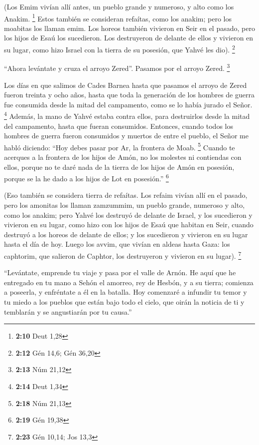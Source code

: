  (Los Emim vivían allí antes, un pueblo grande y
numeroso, y alto como los Anakim. \footnote{\textbf{2:10} Deut 1,28}
 Estos también se consideran refaítas, como los anakim;
pero los moabitas los llaman emim.  Los horeos también
vivieron en Seir en el pasado, pero los hijos de Esaú los sucedieron.
Los destruyeron de delante de ellos y vivieron en su lugar, como hizo
Israel con la tierra de su posesión, que Yahvé les dio). \footnote{\textbf{2:12}
  Gén 14,6; Gén 36,20}

 ``Ahora levántate y cruza el arroyo Zered''. Pasamos por
el arroyo Zered. \footnote{\textbf{2:13} Núm 21,12}

 Los días en que salimos de Cades Barnea hasta que
pasamos el arroyo de Zered fueron treinta y ocho años, hasta que toda la
generación de los hombres de guerra fue consumida desde la mitad del
campamento, como se lo había jurado el Señor. \footnote{\textbf{2:14}
  Deut 1,34}  Además, la mano de Yahvé estaba contra
ellos, para destruirlos desde la mitad del campamento, hasta que fueran
consumidos.  Entonces, cuando todos los hombres de guerra
fueron consumidos y muertos de entre el pueblo,  el Señor
me habló diciendo:  ``Hoy debes pasar por Ar, la frontera
de Moab. \footnote{\textbf{2:18} Núm 21,13}  Cuando te
acerques a la frontera de los hijos de Amón, no los molestes ni
contiendas con ellos, porque no te daré nada de la tierra de los hijos
de Amón en posesión, porque se la he dado a los hijos de Lot en
posesión.'' \footnote{\textbf{2:19} Gén 19,38}

 (Eso también se considera tierra de refaítas. Los refaim
vivían allí en el pasado, pero los amonitas los llaman zamzummim,
 un pueblo grande, numeroso y alto, como los anakim; pero
Yahvé los destruyó de delante de Israel, y los sucedieron y vivieron en
su lugar,  como hizo con los hijos de Esaú que habitan en
Seir, cuando destruyó a los horeos de delante de ellos; y los sucedieron
y vivieron en su lugar hasta el día de hoy.  Luego los
avvim, que vivían en aldeas hasta Gaza: los caphtorim, que salieron de
Caphtor, los destruyeron y vivieron en su lugar). \footnote{\textbf{2:23}
  Gén 10,14; Jos 13,3}

 ``Levántate, emprende tu viaje y pasa por el valle de
Arnón. He aquí que he entregado en tu mano a Sehón el amorreo, rey de
Hesbón, y a su tierra; comienza a poseerla, y enfréntate a él en la
batalla.  Hoy comenzaré a infundir tu temor y tu miedo a
los pueblos que están bajo todo el cielo, que oirán la noticia de ti y
temblarán y se angustiarán por tu causa.''

